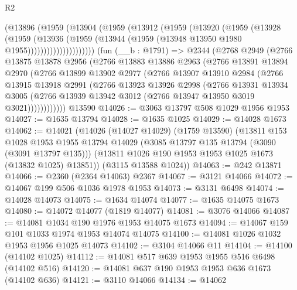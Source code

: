 \begin{lexlean}{R2}
\begin{coremodule}
                (@13896
                  (@1959
                    (@13904
                      (@1959
                        (@13912
                          (@1959
                            (@13920
                              (@1959
                                (@13928
                                  (@1959
                                    (@13936
                                      (@1959
                                        (@13944
                                          (@1959 (@13948 @13950 @1980 @1955)))))))))))))))))))))
    (fun (__b : @1791) =>
    @2344
      (@2768
        @2949
        (@2766
          @13875
          @13878
          @2956
          (@2766
            @13883
            @13886
            @2963
            (@2766
              @13891
              @13894
              @2970
              (@2766
                @13899
                @13902
                @2977
                (@2766
                  @13907
                  @13910
                  @2984
                  (@2766
                    @13915
                    @13918
                    @2991
                    (@2766
                      @13923
                      @13926
                      @2998
                      (@2766
                        @13931
                        @13934
                        @3005
                        (@2766 @13939 @13942 @3012 (@2766 @13947 @13950 @3019 @3021))))))))))))
    @13590
@14026 := @3063 @13797 @508 @1029 @1956 @1953
@14027 := @1635 @13794
@14028 := @1635 @1025
@14029 := @14028 @1673
@14062 := @14021
    (@14026
      (@14027 @14029)
      (@1759 @13590)
      (@13811
        @153
        @1028
        @1953
        @1955
        @13794
        @14029
        (@3085 @13797 @135 @13794 (@3090 (@3091 @13797 @135)))
        (@13811 @1026 @190 @1953 @1953 @1025 @1673 (@13832 @1025) @13851))
      (@3115 @13588 @1024))
@14063 := @242 @13871
@14066 := @2360 (@2364 @14063) @2367
@14067 := @3121 @14066
@14072 := @14067 @199 @506 @1036 @1978 @1953
@14073 := @3131 @6498
@14074 := @14028 @14073
@14075 := @1634 @14074
@14077 := @1635 @14075 @1673
@14080 := @14072 @14077 (@1819 @14077)
@14081 := @3076 @14066
@14087 := @14081 @1034 @190 @1976 @1953 @14075 @1673
@14094 := @14067 @159 @101 @1033 @1974 @1953 @14074 @14075
@14100 := @14081 @1026 @1032 @1953 @1956 @1025 @14073
@14102 := @3104 @14066 @11
@14104 := @14100 (@14102 @1025)
@14112 := @14081 @517 @639 @1953 @1955 @516 @6498 (@14102 @516)
@14120 := @14081 @637 @190 @1953 @1953 @636 @1673 (@14102 @636)
@14121 := @3110 @14066
@14134 := @14062

\end{coremodule}
\end{lexlean}
